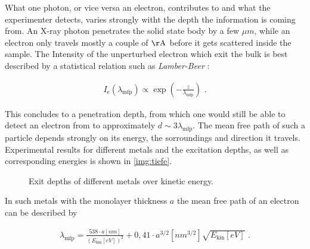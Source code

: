 \documentclass[numbers=noenddot,a4paper,notitlepage,twoside,BCOR15mm]{article}
\newcommand{\ix}[1]{_\text{#1}}
\newcommand{\tilt}[1]{\textit{#1}}
\begin{document}
			What one photon, or vice versa an electron, contributes to and what the experimenter detects, varies strongly witht the depth the information is coming from. An X-ray photon penetrates the solid state body by a few $\unit{\mu m}$, while an electron only travels mostly a couple of $\unit{\AA}$ before it gets scattered inside the sample. The Intensity of the unperturbed electron which exit the bulk is best described by a statistical relation such as \tilt{Lamber-Beer} \cite{XPSRa}:

				\begin{align}
					I\ix{e}(\lambda\ix{mfp})\propto\exp\left(-\frac{z}{\lambda\ix{mfp}}\right)\,\, .\label{eq:weg}
				\end{align}

			This concludes to a penetration depth, from which one would still be able to detect an electron from to approximately $d\sim3\lambda\ix{mfp}$. The mean free path of such a particle depends strongly on its energy, the sorroundings and direction it travels. Experimental results for different metals and the excitation depths, as well as corresponding energies is shown in \autoref{img:tiefe}.

				\begin{figure}[h]
					\centering
					\caption{Exit depths of different metals over kinetic energy.\cite{XPSalt}}\label{img:tiefe}
				\end{figure}

			In such metals with the monolayer thickness $a$ the mean free path of an electron can be described by \cite{XPSRapha}

				\begin{align}
					\lambda\ix{mfp}=\frac{538\cdot a\unit{[nm]}}{(E\ix{kin}\unit{[eV]})^2}+0,41\cdot a^{3/2}\unit{[nm^{3/2}]}\sqrt{E\ix{kin}\unit{[eV]}} \,\,.\label{eq:mfp}
				\end{align}
\end{document}
